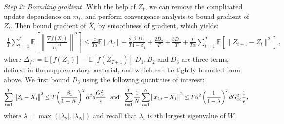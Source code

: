 \documentclass[anon,12pt]{colt2021} %
\begin{document}
 \noindent  \textsl{Step 2: Bounding gradient.} \hspace{0.01in} With the help of $Z_t$, we can remove the complicated update dependence on $m_t$, and perform convergence analysis to bound gradient of $Z_t$. Then bound gradient of $\overline X_t$ by smoothness of gradient, which yields:
 {\small
 \begin{align} \label{eq: exp_telescope_sketchmain}
 \frac{1}{T}\sum_{t=1}^T  \mathbb E \left [\left\|\frac{\nabla f( \overline X_{t})}{\overline U_{t}^{1/4}}\right\|^2  \right] \leq \frac{2}{T\alpha}  \mathbb E  [\Delta_f] 
 + \frac{2}{T}\frac{\beta_1 D_1}{1-\beta_1} 
  + \frac{2 D_2}{T}  + \frac{3 D_3}{T} + \frac{L}{T\alpha} \sum_{t=1}^T\mathbb E\left[\| Z_{t+1}-  Z_{t}\|^2 \right]\, ,
 \end{align}
 }%
where $\Delta_f : = \mathbb E [f( Z_{1})] - \mathbb E [f( Z_{T+1})]$ $D_1, D_2$ and $D_3$ are three terms, defined in the supplementary material, and which can be tightly bounded from above. 
We first bound $D_3$ using the following quantities of interest:
 {\small
 \begin{align}\notag
\sum_{t=1}^T\left\|  Z_{t} -  \overline X_{t}\right\|^2 \leq T \left( \frac{\beta_1}{1-\beta_1}\right)^2 \alpha^2 d \frac{G_{\infty}^2}{\epsilon} \text{\ \ and\ \ } \sum_{t=1}^T\frac{1}{N}\sum_{i=1}^N\left\| {  x_{t,i} -   \overline X_{t}}  \right\|^2 \leq T \alpha^2 \left (\frac{1}{1-\lambda} \right)^2 d G_{\infty}^2 \frac{1}{\epsilon} \, , \notag
 \end{align}
 }
 where $\lambda = \max (|\lambda_2|,|\lambda_N|)$ and recall that $\lambda_i$ is $i$th largest eigenvalue of $W$.
\end{document}
